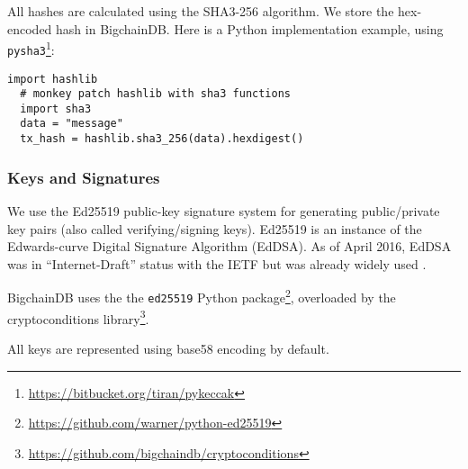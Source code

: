 All hashes are calculated using the SHA3-256 algorithm. We store the hex-encoded hash in BigchainDB. Here is a Python implementation example, using \texttt{pysha3}\footnote{\url{https://bitbucket.org/tiran/pykeccak}}:

\medskip
\begin{minipage}{\linewidth}
  \begin{lstlisting}[style=python]
  import hashlib 
  # monkey patch hashlib with sha3 functions 
  import sha3 
  data = "message" 
  tx_hash = hashlib.sha3_256(data).hexdigest()\end{lstlisting}
\end{minipage}


\subsubsection{Keys and Signatures}

We use the Ed25519 public-key signature system \cite{ed25519} for generating public/private key pairs (also called verifying/signing keys). Ed25519 is an instance of the Edwards-curve Digital Signature Algorithm (EdDSA). As of April 2016, EdDSA was in “Internet-Draft” status with the IETF but was already widely used \cite{I-D.irtf-cfrg-eddsa, ed25519-users}.

BigchainDB uses the the \texttt{ed25519} Python package\footnote{\url{https://github.com/warner/python-ed25519}}, overloaded by the cryptoconditions library\footnote{\url{https://github.com/bigchaindb/cryptoconditions}}.

All keys are represented using base58 encoding by default.

